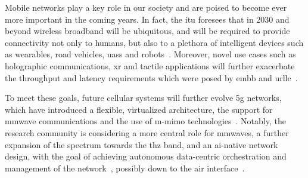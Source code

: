 
Mobile networks play a key role in our society and are poised to become ever more important in the coming years. In fact, the \gls{itu} foresees that in 2030 and beyond wireless broadband will be ubiquitous, and will be required to provide connectivity not only to humans, but also to a plethora of intelligent devices such as wearables, road vehicles, \glspl{uas} and robots~\cite{imt2030}. Moreover, novel use cases such as holographic communications, \gls{xr} and tactile applications will further exacerbate the throughput and latency requirements which were posed by \gls{embb} and \gls{urllc}~\cite{itu-r-2083}. 


To meet these goals, future cellular systems will 
further evolve \gls{5g} 
networks,
which have introduced a flexible, virtualized architecture, the support for \gls{mmwave} communications and the use of \gls{m-mimo} technologies~\cite{ghosh20195g}. Notably, the research community is considering a more central role for \glspl{mmwave}, a further expansion of the spectrum towards the \gls{thz} band, and an \gls{ai}-native network design, with the goal of achieving autonomous data-centric orchestration and management of the network~\cite{polese20216g}, possibly down to the air interface~\cite{10465179}.

